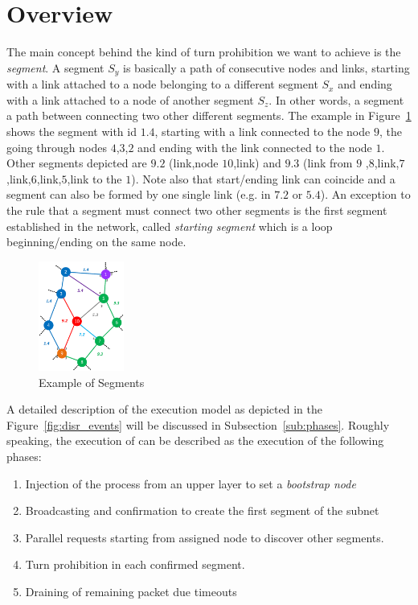 
\section{\disr{} Overview}

\label{sec:disr_concepts}
The main concept behind the kind of turn prohibition we want to
achieve is the \emph{segment}. A segment $S_y$ is basically a path of consecutive
nodes and links, starting with a link attached to a node belonging to
a different segment $S_x$ and ending with a link attached to a
node of another segment $S_z$. In other words, a segment
a path between connecting two other different segments. The example
in Figure~\ref{fig:segments} shows the segment with id $1.4$, starting
with a link connected to the node $9$, the going through nodes
$4$,$3$,$2$ and ending with the link connected to the node $1$. Other
segments depicted are $9.2$ (link,node $10$,link) and $9.3$
(link from $9$ ,$8$,link,$7$,link,$6$,link,$5$,link to the $1$). Note
also that start/ending link can coincide and a segment can also be
formed by one single link (e.g. in $7.2$ or $5.4$).
An exception to the rule that a segment must connect two other
segments is the first segment established in the network, called
\emph{starting segment} which is a loop beginning/ending on the same
node.

\begin{figure}
\centering
    \includegraphics[width=0.25\textwidth]{pictures/network_slice.eps}
  \caption{Example of Segments}
  \label{fig:segments}
\end{figure}

A detailed description of the \disr{} execution model as depicted in
the Figure~\ref{fig:disr_events} will be discussed in
Subsection~\ref{sub:phases}. Roughly speaking, the execution of can be described as the execution
of the following phases: 
\begin{enumerate}
\item Injection of the \disr{} process from an upper layer to set a \emph{bootstrap
node} 
\item Broadcasting and confirmation to create the first segment of the subnet
\item Parallel requests starting from assigned node to discover other
segments. 
\item Turn prohibition in each confirmed segment.
\item Draining of remaining packet due timeouts
\end{enumerate}

